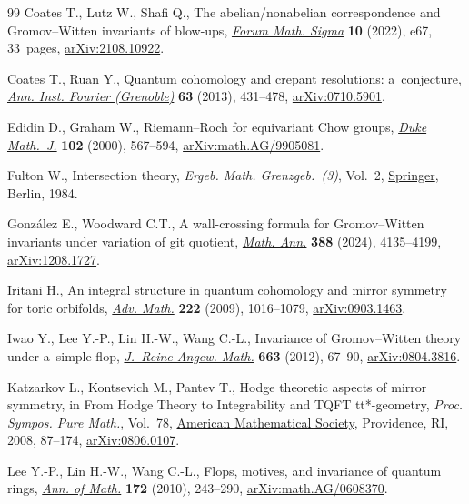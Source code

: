 \documentclass[pdftex]{sigma}
\numberwithin{equation}{section}
\begin{document}
\begin{thebibliography}{99}
Coates T., Lutz W., Shafi Q., The abelian/nonabelian correspondence and
 {G}romov--{W}itten invariants of blow-ups, \href{https://doi.org/10.1017/fms.2022.46}{\textit{Forum Math. Sigma}}
 \textbf{10} (2022), e67, 33~pages, \href{https://arxiv.org/abs/2108.10922}{arXiv:2108.10922}.

Coates T., Ruan Y., Quantum cohomology and crepant resolutions: a~conjecture,
 \href{https://doi.org/10.5802/aif.2766}{\textit{Ann. Inst. Fourier (Grenoble)}} \textbf{63} (2013), 431--478,
 \href{https://arxiv.org/abs/0710.5901}{arXiv:0710.5901}.

Edidin D., Graham W., Riemann--{R}och for equivariant {C}how groups,
 \href{https://doi.org/10.1215/S0012-7094-00-10239-6}{\textit{Duke Math.~J.}} \textbf{102} (2000), 567--594,
 \href{https://arxiv.org/abs/math.AG/9905081}{arXiv:math.AG/9905081}.

Fulton W., Intersection theory, \textit{Ergeb. Math. Grenzgeb.~(3)}, Vol.~2,
 \href{https://doi.org/10.1007/978-3-662-02421-8}{Springer}, Berlin, 1984.

Gonz\'alez E., Woodward C.T., A wall-crossing formula for {G}romov--{W}itten
 invariants under variation of git quotient, \href{https://doi.org/10.1007/s00208-023-02622-w}{\textit{Math. Ann.}} \textbf{388}
 (2024), 4135--4199, \href{https://arxiv.org/abs/1208.1727}{arXiv:1208.1727}.

Iritani H., An integral structure in quantum cohomology and mirror symmetry for
 toric orbifolds, \href{https://doi.org/10.1016/j.aim.2009.05.016}{\textit{Adv. Math.}} \textbf{222} (2009), 1016--1079,
 \href{https://arxiv.org/abs/0903.1463}{arXiv:0903.1463}.

Iwao Y., Lee Y.-P., Lin H.-W., Wang C.-L., Invariance of {G}romov--{W}itten theory
 under a~simple flop, \href{https://doi.org/10.1515/CRELLE.2011.097}{\textit{J.~Reine Angew. Math.}} \textbf{663} (2012),
 67--90, \href{https://arxiv.org/abs/0804.3816}{arXiv:0804.3816}.

Katzarkov L., Kontsevich M., Pantev T., Hodge theoretic aspects of mirror
 symmetry, in From {H}odge Theory to Integrability and {TQFT} tt*-geometry,
 \textit{Proc. Sympos. Pure Math.}, Vol.~78, \href{https://doi.org/10.1090/pspum/078/2483750}{American Mathematical Society},
 Providence, RI, 2008, 87--174, \href{https://arxiv.org/abs/0806.0107}{arXiv:0806.0107}.

Lee Y.-P., Lin H.-W., Wang C.-L., Flops, motives, and invariance of quantum rings,
 \href{https://doi.org/10.4007/annals.2010.172.243}{\textit{Ann. of Math.}} \textbf{172} (2010), 243--290,
 \href{https://arxiv.org/abs/math.AG/0608370}{arXiv:math.AG/0608370}.


\end{thebibliography}
\end{document}
